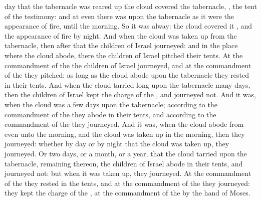 {day that the
tabernacle was reared
up the
cloud
covered the
tabernacle,
{}, the
tent of the
testimony: and at
even there was upon the
tabernacle as it were the
appearance of
fire, until the
morning.
So it was
alway: the
cloud
covered it
{}, and the
appearance of
fire by
night.
And
when the
cloud was taken
up from the
tabernacle, then
after that the
children of
Israel
journeyed: and in the
place where the
cloud
abode, there the
children of
Israel pitched their
tents.
At the
commandment of the
{} the
children of
Israel
journeyed, and at the
commandment of the
{} they
pitched: as long
as the
cloud
abode upon the
tabernacle they
rested in their tents.
And when the
cloud tarried
long upon the
tabernacle
many
days, then the
children of
Israel
kept the
charge of the
{}, and
journeyed not.
And
{} it
was, when the
cloud was a
few
days upon the
tabernacle; according to the
commandment of the
{} they
abode in their tents, and according to the
commandment of the
{} they
journeyed.
And
{} it
was, when the
cloud abode from
even unto the
morning, and
{} the
cloud was taken
up in the
morning, then they
journeyed: whether
{} by
day or by
night that the
cloud was taken
up, they
journeyed.
Or
{} two
days, or a
month, or a
year, that the
cloud
tarried upon the
tabernacle,
remaining thereon, the
children of
Israel
abode in their tents, and
journeyed not: but when it was taken
up, they
journeyed.
At the
commandment of the
{} they
rested in the tents, and at the
commandment of the
{} they
journeyed: they
kept the
charge of the
{}, at the
commandment of the
{} by the
hand of
Moses.

}

